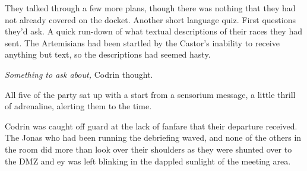 They talked through a few more plans, though there was nothing that they had not already covered on the docket. Another short language quiz. First questions they'd ask. A quick run-down of what textual descriptions of their races they had sent. The Artemisians had been startled by the Castor's inability to receive anything but text, so the descriptions had seemed hasty.

\emph{Something to ask about,} Codrin thought.

All five of the party sat up with a start from a sensorium message, a little thrill of adrenaline, alerting them to the time.

Codrin was caught off guard at the lack of fanfare that their departure received. The Jonas who had been running the debriefing waved, and none of the others in the room did more than look over their shoulders as they were shunted over to the DMZ and ey was left blinking in the dappled sunlight of the meeting area.
